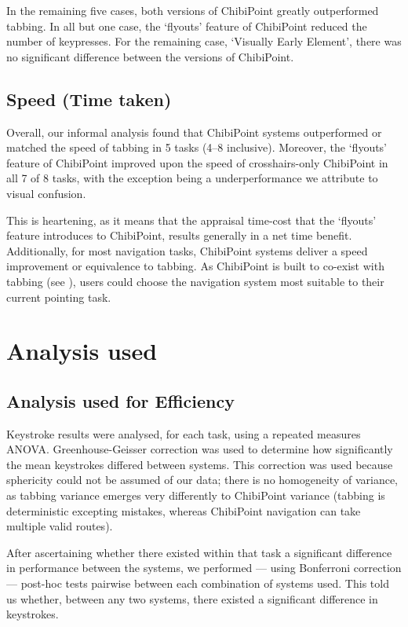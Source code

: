 \documentclass[11pt,openright,a4paper]{report}
\begin{document}
In the remaining five cases, both versions of ChibiPoint greatly outperformed tabbing. In all but one case, the `flyouts' feature of ChibiPoint reduced the number of keypresses. For the remaining case, `Visually Early Element', there was no significant difference between the versions of ChibiPoint.
\subsection{Speed (Time taken)}
Overall, our informal analysis found that ChibiPoint systems outperformed or matched the speed of tabbing in 5 tasks (4--8 inclusive). Moreover, the `flyouts' feature of ChibiPoint improved upon the speed of crosshairs-only ChibiPoint in all 7 of 8 tasks, with the exception being a underperformance we attribute to visual confusion.

This is heartening, as it means that the appraisal time-cost that the `flyouts' feature introduces to ChibiPoint, results generally in a net time benefit. Additionally, for most navigation tasks, ChibiPoint systems deliver a speed improvement or equivalence to tabbing. As ChibiPoint is built to co-exist with tabbing (see ), users could choose the navigation system most suitable to their current pointing task.

\section{Analysis used}
\subsection{Analysis used for Efficiency}
Keystroke results were analysed, for each task, using a repeated measures ANOVA. Greenhouse-Geisser correction was used to determine how significantly the mean keystrokes differed between systems. This correction was used because sphericity could not be assumed of our data; there is no homogeneity of variance, as tabbing variance emerges very differently to ChibiPoint variance (tabbing is deterministic excepting mistakes, whereas ChibiPoint navigation can take multiple valid routes).

After ascertaining whether there existed within that task a significant difference in performance between the systems, we performed --- using Bonferroni correction --- post-hoc tests pairwise between each combination of systems used. This told us whether, between any two systems, there existed a significant difference in keystrokes.
\end{document}
